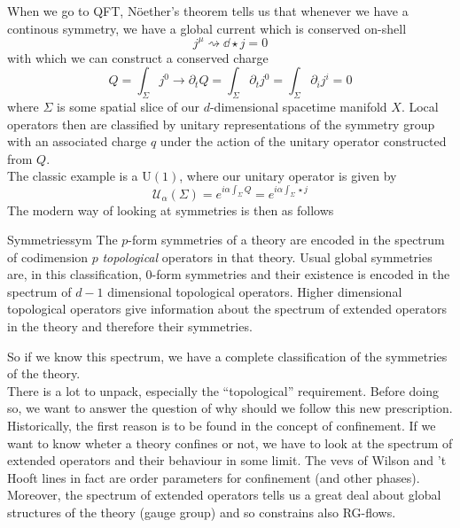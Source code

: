 \documentclass[11pt]{article}
\theoremstyle{definition}
\numberwithin{equation}{section}
\newcommand*\cU{\mathcal{U}}
\newcommand*\U{\mathrm{U}}
\begin{document}
When we go to QFT, Nöether's theorem tells us that whenever we have a continous symmetry, we have a global current which is conserved on-shell
\begin{equation}
	j^{\mu}\rightsquigarrow\dd\star j=0
\end{equation}
with which we can construct a conserved charge
\begin{equation}
	Q=\int_{\Sigma}j^{0}\rightarrow \partial_{t}Q=\int_{\Sigma}\partial_{t}j^{0}=\int_{\Sigma}\partial_{i}j^{i}=0
\end{equation}
where $\Sigma$ is some spatial slice of our $d$-dimensional spacetime manifold $X$. Local operators then are classified by unitary representations of the symmetry group with an associated charge $q$ under the action of the unitary operator constructed from $Q$.\\
The classic example is a $\U(1)$, where our unitary operator is given by
\begin{equation}
	\cU_{\alpha}(\Sigma)=e^{i\alpha\int_{\Sigma}Q}=e^{i\alpha\int_{\Sigma}\star j}
\end{equation}
The modern way of looking at symmetries is then as follows
\begin{defn}{Symmetries}{sym}
	The $p$-form symmetries of a theory are encoded in the spectrum of codimension $p$ \textit{topological} operators in that theory. Usual global symmetries are, in this classification, $0$-form symmetries and their existence is encoded in the spectrum of $d-1$ dimensional topological operators. Higher dimensional topological operators give information about the spectrum of extended operators in the theory and therefore their symmetries.
\end{defn}
So if we know this spectrum, we have a complete classification of the symmetries of the theory.\\
There is a lot to unpack, especially the ``topological'' requirement. Before doing so, we want to answer the question of why should we follow this new prescription. Historically, the first reason is to be found in the concept of confinement. If we want to know wheter a theory confines or not, we have to look at the spectrum of extended operators and their behaviour in some limit. The vevs of Wilson and 't Hooft lines in fact are order parameters for confinement (and other phases).\\
Moreover, the spectrum of extended operators tells us a great deal about global structures of the theory (gauge group) and so constrains also RG-flows.
\end{document}

